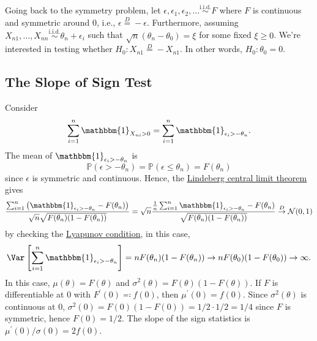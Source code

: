 Going back to the symmetry problem, let \(\epsilon , \epsilon _1, \epsilon _2, \dots \overset{\text{i.i.d.} }{\sim } F\) where \(F\) is continuous and symmetric around \(0\), i.e., \(\epsilon \overset{D}{=} -\epsilon \). Furthermore, assuming \(X_{n1}, \dots , X_{nn} \overset{\text{i.i.d.} }{\sim } \theta _n + \epsilon _i\) such that \(\sqrt{n} (\theta _n - \theta _0) = \xi \) for some fixed \(\xi \geq 0\). We're interested in testing whether \(H_0 \colon X_{n1} \overset{D}{=} -X_{n1}\). In other words, \(H_0 \colon \theta _0 = 0\).

\subsection{The Slope of Sign Test}
Consider
\[
	\sum_{i=1}^{n} \mathbbm{1}_{X_{ni} > 0}
	= \sum_{i=1}^{n} \mathbbm{1}_{\epsilon _i > - \theta _n}.
\]
The mean of \(\mathbbm{1}_{\epsilon _i > -\theta _n} \) is
\[
	\mathbb{P} (\epsilon > -\theta _n)
	= \mathbb{P} (\epsilon \leq \theta _n)
	= F(\theta _n)
\]
since \(\epsilon \) is symmetric and continuous. Hence, the \hyperref[thm:Lindeberg-CLT]{Lindeberg central limit theorem} gives
\[
	\frac{\sum_{i=1}^{n} \left( \mathbbm{1}_{\epsilon _i  > -\theta _n} - F(\theta _n) \right) }{\sqrt{n} \sqrt{F(\theta _n) (1 - F(\theta _n))} }
	= \sqrt{n} \frac{\frac{1}{n} \sum_{i=1}^{n} \mathbbm{1}_{\epsilon _i > -\theta _n} - F(\theta _n) }{\sqrt{F(\theta _n) (1 - F(\theta _n)) } }
	\overset{D}{\to} \mathcal{N} (0, 1)
\]
by checking the \hyperref[col:Lyapunov-CLT]{Lyapunov condition}, in this case,
\[
	\Var_{}\left[\sum_{i=1}^{n} \mathbbm{1}_{\epsilon _i > -\theta _n} \right]
	= n F(\theta _n) (1 - F(\theta _n))
	\to n F(\theta _0) (1 - F(\theta _0))
	\to \infty.
\]
In this case, \(\mu (\theta ) = F(\theta )\) and \(\sigma ^2(\theta ) = F(\theta )(1 - F(\theta ))\). If \(F\) is differentiable at \(0\) with \(F^{\prime} (0) \eqqcolon f(0)\), then \(\mu ^{\prime} (0) = f(0)\). Since \(\sigma ^2 (\theta )\) is continuous at \(0\), \(\sigma ^2(0) = F(0)(1 - F(0)) = 1 / 2 \cdot 1 / 2 = 1 / 4\) since \(F\) is symmetric, hence \(F(0) = 1 / 2\). The slope of the sign statistics is \(\mu ^{\prime} (0) / \sigma (0) = 2f(0)\).

